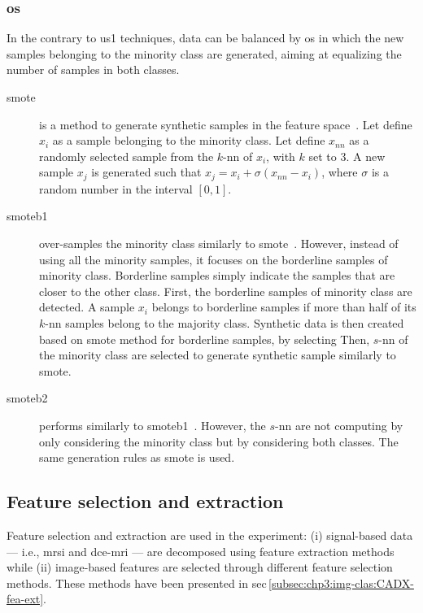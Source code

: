 \subsubsection{\Acl*{os}}
In the contrary to \ac{us1} techniques, data can be balanced by \ac{os} in which the new samples belonging to the minority class are generated, aiming at equalizing the number of samples in both classes.

\begin{description}
\item[\Ac{smote}] is a method to generate synthetic samples in the feature space~\cite{chawla2002smote}.
Let define $x_i$ as a sample belonging to the minority class.
Let define $x_{nn}$ as a randomly selected sample from the $k$-\ac{nn} of $x_i$, with $k$ set to 3.
A new sample $x_j$ is generated such that $x_j = x_i + \sigma \left( x_{nn} - x_i \right)$, where $\sigma$ is a random number in the interval $\left[0,1\right]$.
\item[\Ac{smoteb1}] over-samples the minority class similarly to \ac{smote}~\cite{han2005borderline}.
However, instead of using all the minority samples, it focuses on the borderline samples of minority class.
Borderline samples simply indicate the samples that are closer to the other class.
First, the borderline samples of minority class are detected.
A sample $x_{i}$ belongs to borderline samples if more than half of its $k$-\ac{nn} samples belong to the majority class.
Synthetic data is then created based on \ac{smote} method for borderline samples, by selecting 
Then, $s$-\ac{nn} of the minority class are selected to generate synthetic sample similarly to \ac{smote}.
 
\item[\Ac{smoteb2}] performs similarly to \ac{smoteb1}~\cite{han2005borderline}.
However, the $s$-\ac{nn} are not computing by only considering the minority class but by considering both classes.
The same generation rules as \ac{smote} is used.
\end{description}

\subsection{Feature selection and extraction}\label{subsec:chp6:method:fea-sel}


Feature selection and extraction are used in the experiment: (i) signal-based data --- i.e., \ac{mrsi} and \ac{dce}-\ac{mri} --- are decomposed using feature extraction methods while (ii) image-based features are selected through different feature selection methods.
These methods have been presented in \acs{sec}\,\ref{subsec:chp3:img-clas:CADX-fea-ext}.

